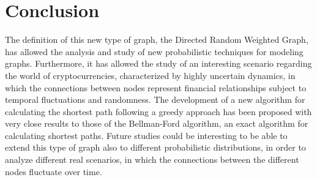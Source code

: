 \section{Conclusion}\label{conclusion}
The definition of this new type of graph, the Directed Random Weighted Graph, has allowed the analysis and study of new probabilistic techniques for modeling graphs. Furthermore, it has allowed the study of an interesting scenario regarding the world of cryptocurrencies, characterized by highly uncertain dynamics, in which the connections between nodes represent financial relationships subject to temporal fluctuations and randomness.
The development of a new algorithm for calculating the shortest path following a greedy approach has been proposed with very close results to those of the Bellman-Ford algorithm, an exact algorithm for calculating shortest paths.
Future studies could be interesting to be able to extend this type of graph also to different probabilistic distributions, in order to analyze different real scenarios, in which the connections between the different nodes fluctuate over time.
